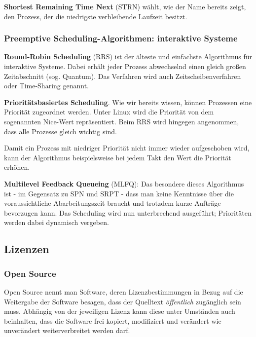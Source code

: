 \textbf{Shortest Remaining Time Next} (STRN) wählt, wie der Name bereits zeigt, den Prozess, der die niedrigste verbleibende Laufzeit besitzt.

\subsubsection{Preemptive Scheduling-Algorithmen: interaktive Systeme}

\textbf{Round-Robin Scheduling} (RRS) ist der älteste und einfachste Algorithmus für interaktive Systeme. Dabei erhält jeder Prozess abwechselnd einen gleich großen Zeitabschnitt (sog. Quantum). Das Verfahren wird auch Zeitscheibenverfahren oder Time-Sharing genannt.

\textbf{Prioritätsbasiertes Scheduling}. Wie wir bereits wissen, können Prozessen eine Priorität zugeordnet werden. Unter Linux wird die Priorität von dem sogenannten Nice-Wert repräsentiert. Beim RRS wird hingegen angenommen, dass alle Prozesse gleich wichtig sind.

Damit ein Prozess mit niedriger Priorität nicht immer wieder aufgeschoben wird, kann der Algorithmus beispielsweise bei jedem Takt den Wert die Priorität erhöhen.

\textbf{Multilevel Feedback Queueing} (MLFQ): Das besondere dieses Algorithmus ist - im Gegensatz zu SPN und SRPT - dass man keine Kenntnisse über die voraussichtliche Abarbeitungszeit braucht und trotzdem kurze Aufträge bevorzugen kann. Das Scheduling wird nun unterbrechend ausgeführt; Prioritäten werden dabei dynamisch vergeben.


\subsection{Lizenzen}

\subsubsection{Open Source}

Open Source nennt man Software, deren Lizenzbestimmungen in Bezug auf die Weitergabe der Software besagen, dass der Quelltext {\it öffentlich} zugänglich sein muss. Abhängig von der jeweiligen Lizenz kann diese unter Umständen auch beinhalten, dass die Software frei kopiert, modifiziert und verändert wie unverändert weiterverbreitet werden darf.

